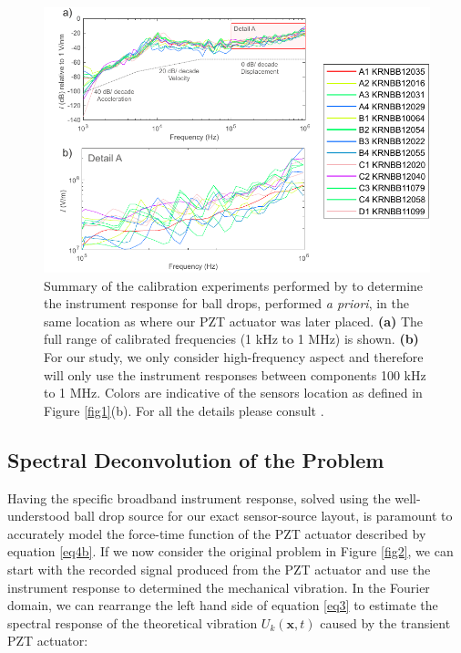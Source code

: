 \documentclass[preprint,3p, 11pt,authoryear]{elsarticle}
\begin{document}
{\begin{figure}[ht]
     	\centering
\includegraphics[scale= 1.0]{FIG6.pdf} 
\caption{Summary of the calibration experiments performed by \citet{Wu2020} to determine the instrument response for ball drops, performed \textit{a priori}, in the same location as where our PZT actuator was later placed. \textbf{(a)} The full range of calibrated frequencies (1 kHz to 1 MHz) is shown. \textbf{(b)} For our study, we only consider high-frequency aspect and therefore will only use the instrument responses between components 100 kHz to 1 MHz.  Colors are indicative of the sensors location as defined in Figure \ref{fig1}(b). For all the details please consult \citet{Wu2020}. }
	\label{fig6} 
\end{figure}

\subsection{Spectral Deconvolution of the Problem}

Having the specific broadband instrument response, solved using the well-understood ball drop source for our exact sensor-source layout, is paramount to accurately model the force-time function of the PZT actuator described by equation \eqref{eq4b}.   If we now consider the original problem in Figure \ref{fig2}, we can start with the recorded signal produced from the PZT actuator and use the instrument response to determined the mechanical vibration.  In the Fourier domain, we can rearrange the left hand side of equation \eqref{eq3} to estimate the spectral response of the theoretical vibration $U_{k}(\mathbf{x},t)$ caused by the transient PZT actuator:

}
\end{document}
